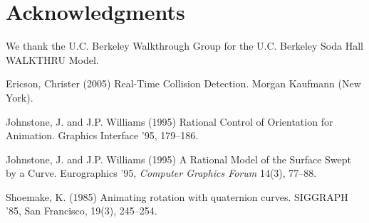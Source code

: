 \documentclass{sig-alternate}
\begin{document}
\section{Acknowledgments}
We thank the U.C. Berkeley Walkthrough Group for the U.C. Berkeley Soda Hall
WALKTHRU Model.
%
%
%
%


% 
\begin{thebibliography}{}

Ericson, Christer (2005)
Real-Time Collision Detection.
Morgan Kaufmann (New York).

Johnstone, J. and J.P. Williams (1995)
Rational Control of Orientation for Animation.
Graphics Interface '95, 179--186.

Johnstone, J. and J.P. Williams (1995)
A Rational Model of the Surface Swept by a Curve.
Eurographics '95, {\em Computer Graphics Forum} 14(3), 77--88.

Shoemake, K. (1985) Animating rotation with quaternion curves.
SIGGRAPH '85, San Francisco, 19(3), 245--254.

\end{thebibliography}
\end{document}
